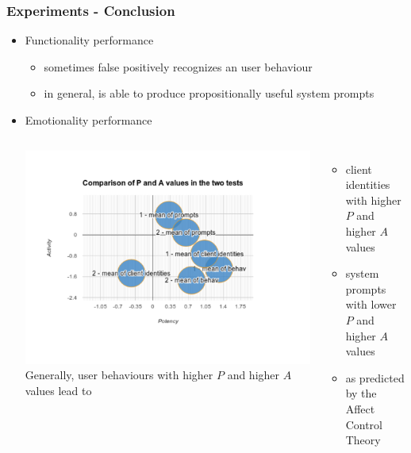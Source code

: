 \documentclass{beamer}
\begin{document}
\begin{frame}
\frametitle{Experiments - Conclusion}
\begin{itemize}
\item Functionality performance
\begin{itemize}
\item sometimes false positively recognizes an user behaviour
\item in general, is able to produce propositionally useful system prompts
\end{itemize}
\item Emotionality performance
\begin{columns}[c]
\includegraphics[trim=10mm 45mm 25mm 10mm, clip, width=\linewidth]{fig/fig-compare-two-tests.pdf}
Generally, user behaviours with higher $P$ and higher $A$ values lead to
\begin{itemize}
\item client identities with higher $P$ and higher $A$ values
\item system prompts with lower $P$ and higher $A$ values
\item as predicted by the Affect Control Theory
\end{itemize}
\end{columns}
\end{itemize}
\end{frame}
\end{document}
